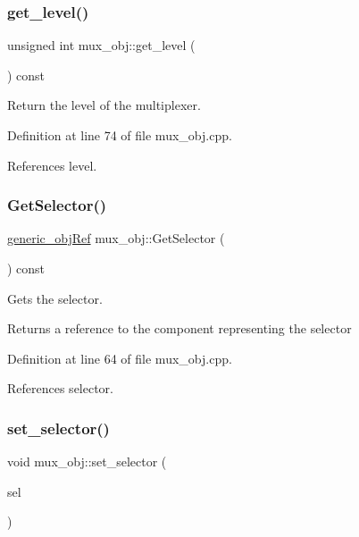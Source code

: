 \subsubsection{\texorpdfstring{get\+\_\+level()}{get\_level()}}
{\footnotesize\ttfamily unsigned int mux\+\_\+obj\+::get\+\_\+level (\begin{DoxyParamCaption}{ }\end{DoxyParamCaption}) const}



Return the level of the multiplexer. 



Definition at line 74 of file mux\+\_\+obj.\+cpp.



References level.

\mbox{\label{classmux__obj_a317c877ec50b264b68d9adf3cecf2d84}} 
\subsubsection{\texorpdfstring{Get\+Selector()}{GetSelector()}}
{\footnotesize\ttfamily \hyperlink{generic__obj_8hpp_acb533b2ef8e0fe72e09a04d20904ca81}{generic\+\_\+obj\+Ref} mux\+\_\+obj\+::\+Get\+Selector (\begin{DoxyParamCaption}{ }\end{DoxyParamCaption}) const}



Gets the selector. 

\begin{DoxyReturn}{Returns}
a reference to the component representing the selector 
\end{DoxyReturn}


Definition at line 64 of file mux\+\_\+obj.\+cpp.



References selector.

\mbox{\label{classmux__obj_a54f02bc26c0bd5faf68aa83780e0d731}} 
\subsubsection{\texorpdfstring{set\+\_\+selector()}{set\_selector()}}
{\footnotesize\ttfamily void mux\+\_\+obj\+::set\+\_\+selector (\begin{DoxyParamCaption}\item[{const \hyperlink{generic__obj_8hpp_acb533b2ef8e0fe72e09a04d20904ca81}{generic\+\_\+obj\+Ref}}]{sel }\end{DoxyParamCaption})}



